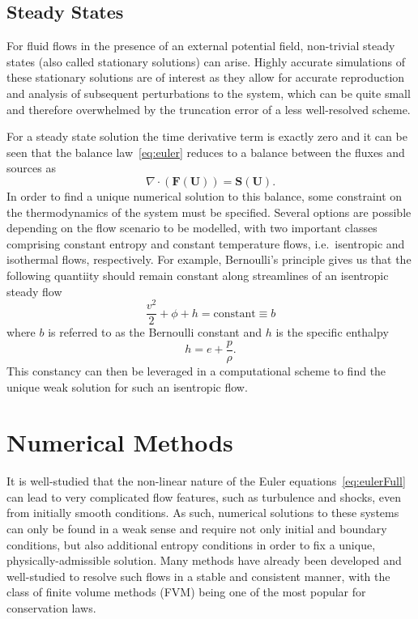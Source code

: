 \subsection{Steady States}

For fluid flows in the presence of an external potential field, non-trivial steady states (also called stationary solutions) can arise. Highly accurate simulations of these stationary solutions are of interest as they allow for accurate reproduction and analysis of subsequent perturbations to the system, which can be quite small and therefore overwhelmed by the truncation error of a less well-resolved scheme.

For a steady state solution the time derivative term is exactly zero and it can be seen that the balance law~\eqref{eq:euler} reduces to a balance between the fluxes and sources as
\begin{equation} \label{eq:balance}
\nabla\cdot(\mathbf{F}(\mathbf{U}))=\mathbf{S}(\mathbf{U}).
\end{equation}
In order to find a unique numerical solution to this balance, some constraint on the thermodynamics of the system must be specified. Several options are possible depending on the flow scenario to be modelled, with two important classes comprising constant entropy and constant temperature flows, i.e.~isentropic and isothermal flows, respectively. For example, Bernoulli's principle gives us that the following quantiity should remain constant along streamlines of an isentropic steady flow
\begin{equation} \label{eq:bernoulli_constant}
\frac{v^2}{2}+\phi+h=\textrm{constant}\equiv b
\end{equation}
where $b$ is referred to as the Bernoulli constant and $h$ is the specific enthalpy
\begin{equation} \label{eq:enthalpy}
h=e+\frac{p}{\rho}.
\end{equation}
This constancy can then be leveraged in a computational scheme to find the unique weak solution for such an isentropic flow.


\section{Numerical Methods}
\label{sec:numerics}

It is well-studied that the non-linear nature of the Euler equations~\eqref{eq:eulerFull} can lead to very complicated flow features, such as turbulence and shocks, even from initially smooth conditions. As such, numerical solutions to these systems can only be found in a weak sense and require not only initial and boundary conditions, but also additional entropy conditions in order to fix a unique, physically-admissible solution. Many methods have already been developed and well-studied to resolve such flows in a stable and consistent manner, with the class of finite volume methods (FVM) being one of the most popular for conservation laws.

